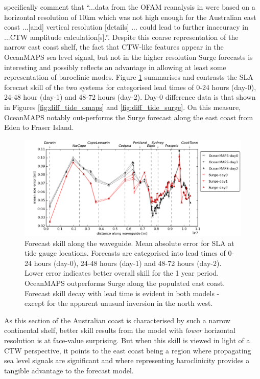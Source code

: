 \citet[p.312]{Liao:2018jd} specifically comment that ``...data from the OFAM reanalysis in \citet{Woodham:2013cl} were based on a horizontal resolution of 10km which was not high enough for the Australian east coast ...[and] vertical resolution [details] ... could lead to further inaccuracy in ...CTW amplitude calculation[s].''.
Despite this coarse representation of the narrow east coast shelf, the fact that CTW-like features appear in the OceanMAPS sea level signal, but not in the higher resolution Surge forecasts is interesting and possibly reflects an advantage in allowing at least some representation of baroclinic modes.   
Figure \ref{fig:skill_mebs} summarises and contrasts the SLA forecast skill of the two systems for categorised lead times of 0-24 hours (day-0), 24-48 hour (day-1) and 48-72 hours (day-2).  Day-0 difference data is that shown in Figures \ref{fig:diff_tide_omaps} and \ref{fig:diff_tide_surge}.
On this measure, OceanMAPS notably out-performs the Surge forecast along the east coast from Eden to Fraser Island.
\begin{figure}[H]\centering
    \noindent\includegraphics[width=\figwidthFull]{figures/plots/plot_skill_path_mebs.png}
    \caption[Forecast skill along the waveguide.]
            {Forecast skill along the waveguide. Mean absolute error for SLA at tide gauge locations. Forecasts are categorised into lead times of 0-24 hours (day-0), 24-48 hours (day-1) and 48-72 hours (day-2).  
            Lower error indicates better overall skill for the 1 year period.
            OceanMAPS outperforms Surge along the populated east coast.
            Forecast skill decay with lead time is evident in both models - except for the apparent unusual inversion in the north west.}
    \label{fig:skill_mebs}
\end{figure}
As this section of the Australian coast is characterised by such a narrow continental shelf, better skill results from the model with \emph{lower} horizontal resolution is at face-value surprising.  But when this skill is viewed in light of a CTW perspective, it points to the east coast being a region where  propagating sea level signals are significant and where representing baroclinicity provides a tangible advantage to the forecast model.

